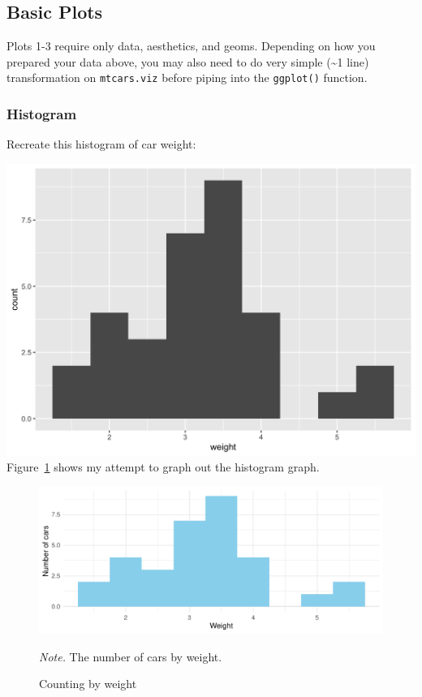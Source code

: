 \documentclass[
  man,
  floatsintext,
  longtable,
  nolmodern,
  notxfonts,
  notimes,
  colorlinks=true,linkcolor=blue,citecolor=blue,urlcolor=blue]{apa7}
\begin{document}
\subsection{Basic Plots}\label{basic-plots}

Plots 1-3 require only data, aesthetics, and geoms. Depending on how you
prepared your data above, you may also need to do very simple
(\textasciitilde1 line) transformation on \texttt{mtcars.viz} before
piping into the \texttt{ggplot()} function.

\subsubsection{Histogram}\label{histogram}

Recreate this histogram of car weight:

\includegraphics{plots/plot1.png} Figure~\ref{fig-plot1-histogram} shows
my attempt to graph out the histogram graph.

\begin{figure}[H]

{\caption{{Counting by weight}{\label{fig-plot1-histogram}}}}

\includegraphics{data-visualization_files/figure-pdf/fig-plot1-histogram-1.pdf}

{\noindent \emph{Note.} The number of cars by weight.}

\end{figure}
\end{document}
